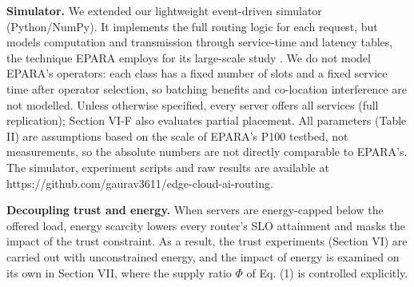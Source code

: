 \documentclass[journal]{IEEEtran}
\begin{document}
\textbf{Simulator.} We extended our lightweight event-driven simulator (Python/NumPy). It implements the full routing logic for each request, but models computation and transmission through service-time and latency tables, the technique EPARA employs for its large-scale study \cite{epara2025}. We do not model EPARA's operators: each class has a fixed number of slots and a fixed service time after operator selection, so batching benefits and co-location interference are not modelled. Unless otherwise specified, every server offers all services (full replication); Section VI-F also evaluates partial placement. All parameters (Table II) are assumptions based on the scale of EPARA's P100 testbed, not measurements, so the absolute numbers are not directly comparable to EPARA's. The simulator, experiment scripts and raw results are available at https://github.com/gaurav3611/edge-cloud-ai-routing.

\textbf{Decoupling trust and energy.} When servers are energy-capped below the offered load, energy scarcity lowers every router's SLO attainment and masks the impact of the trust constraint. As a result, the trust experiments (Section VI) are carried out with unconstrained energy, and the impact of energy is examined on its own in Section VII, where the supply ratio \(\Phi\) of Eq. (1) is controlled explicitly.
\end{document}
